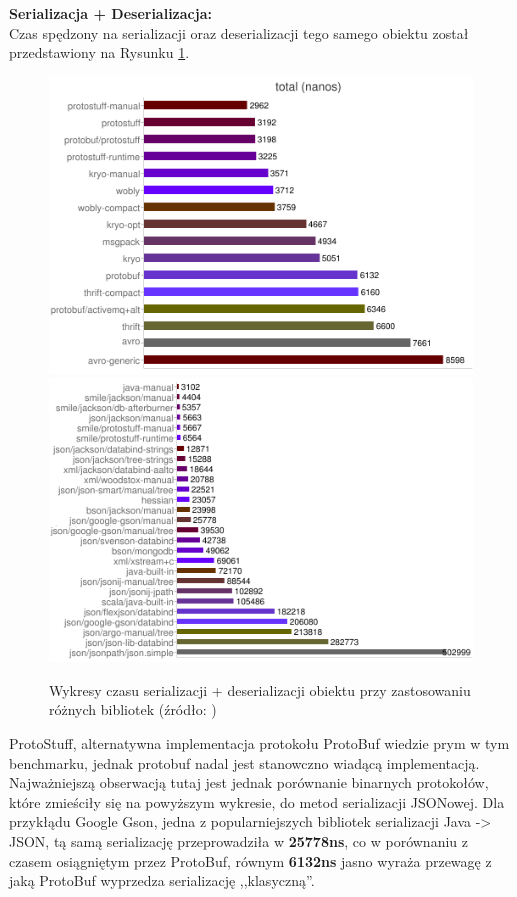 \textbf{Serializacja + Deserializacja:}\\
Czas spędzony na serializacji oraz deserializacji tego samego obiektu został przedstawiony na Rysunku \ref{serializers1}. 

\begin{figure}[ch!]
 \includegraphics[scale=0.8]{proto_1}
 \includegraphics[scale=1]{proto_2} 
 \caption{Wykresy czasu serializacji + deserializacji obiektu przy zastosowaniu różnych bibliotek (źródło: \cite{Jvmserializers})}
 \label{serializers1}
\end{figure}

ProtoStuff, alternatywna implementacja protokołu ProtoBuf wiedzie prym w tym benchmarku, jednak protobuf nadal jest stanowczno wiadącą implementacją.
Najważniejszą obserwacją tutaj jest jednak porównanie binarnych protokołów, które zmieściły się na powyższym wykresie, do metod serializacji JSONowej.
Dla przykłądu Google Gson, jedna z popularniejszych bibliotek serializacji Java -> JSON, tą samą serializację przeprowadziła w \textbf{25778ns}, co w porównaniu
z czasem osiągniętym przez ProtoBuf, równym \textbf{6132ns} jasno wyraża przewagę z jaką ProtoBuf wyprzedza serializację ,,klasyczną''.

